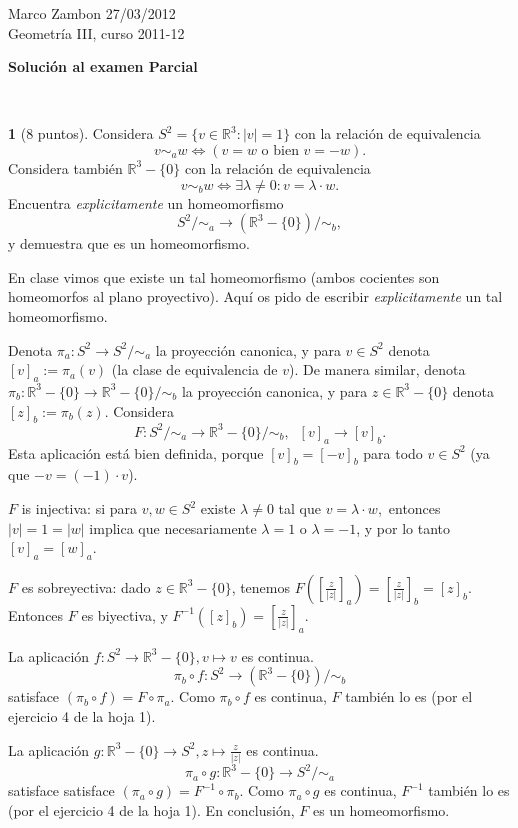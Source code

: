 \documentclass[12pt,a4paper]{report}
\theoremstyle{definition}
\newtheorem{ex}{}
\newcommand{\RR}{\ensuremath{\mathbb R}}
\begin{document}
\noindent
{\sffamily\large Marco Zambon 
\hfill     27/03/2012\\Geometr\'ia III, curso 2011-12}
 

\begin{center}\bfseries\large\textsf{Soluci\'on al examen Parcial    \vspace{-2mm}}
\end{center}

 

 \noindent
\hrulefill{}\\
 
 
\begin{ex}[8 puntos]    
Considera $S^2=\{v\in \RR^3: |v|=1\}$  con la relaci\'on de equivalencia $$v\sim_a w \Leftrightarrow (v=w \text{ o bien } v=-w).$$
Considera tambi\'en  $\RR^3-\{0\}$ con la relaci\'on de equivalencia $$v\sim_b w \Leftrightarrow \exists \lambda \neq 0: v=\lambda \cdot  w.$$
Encuentra \emph{explicitamente} un homeomorfismo $$S^2/\sim_a \to (\RR^3-\{0\})/\sim_b,$$ y demuestra que es un homeomorfismo.

 En clase vimos que existe un tal homeomorfismo
(ambos cocientes son homeomorfos al plano proyectivo). Aqu\'i os pido de escribir \emph{explicitamente} un tal homeomorfismo.
\end{ex}

 \begin{it}
Denota $\pi_a \colon S^2\to S^2/\sim_a$ la proyecci\'on canonica, y para $v\in S^2$ denota
$[v]_a:=\pi_a(v)$ (la clase de equivalencia de $v$). De manera similar, denota $\pi_b \colon \RR^3-\{0\}\to \RR^3-\{0\}/\sim_b$ la proyecci\'on canonica, y para $z\in \RR^3-\{0\}$ denota
$[z]_b:=\pi_b(z)$.
Considera
$$F \colon  S^2/\sim_a \to \RR^3-\{0\}/\sim_b,\;\; [v]_a \to [v]_b.$$ Esta aplicaci\'on est\'a bien definida, porque $[v]_b=[-v]_b$ para todo $v\in S^2$ (ya que $-v=(-1)\cdot v$). 

$F$ is injectiva: si para $v,w\in S^2$ existe  $\lambda \neq 0$ tal que $v=\lambda \cdot w,$ entonces $|v|=1=|w|$ implica que necesariamente $\lambda=1$ o $\lambda=-1$, y por lo tanto $[v]_a=[w]_a$.

 $F$ es sobreyectiva: dado $z\in \RR^3-\{0\}$, tenemos $F([\frac{z}{|z|}]_a)=[\frac{z}{|z|}]_b=[z]_b$. 
Entonces $F$ es biyectiva, y $F^{-1}([z]_b)=[\frac{z}{|z|}]_a$.


La aplicaci\'on $f\colon S^2 \to \RR^3-\{0\}, v\mapsto v$ es continua. $$\pi_b \circ f\colon  S^2 \to (\RR^3-\{0\})/\sim_b$$
satisface $(\pi_b \circ f)=F \circ \pi_a$. Como $\pi_b \circ f$ es continua, $F$ tambi\'en lo es (por el ejercicio 4 de la hoja 1).

La aplicaci\'on $g\colon \RR^3-\{0\} \to S^2, z\mapsto \frac{z}{|z|}$ es
continua. $$\pi_a \circ g \colon \RR^3-\{0\} \to S^2/\sim_a $$
satisface
satisface $(\pi_a \circ g)=F^{-1} \circ \pi_b$. Como $\pi_a \circ g$ es continua, $F^{-1}$ tambi\'en lo es (por el ejercicio 4 de la hoja 1).
En conclusi\'on, $F$ es un homeomorfismo.
\end{it}
\end{document}
